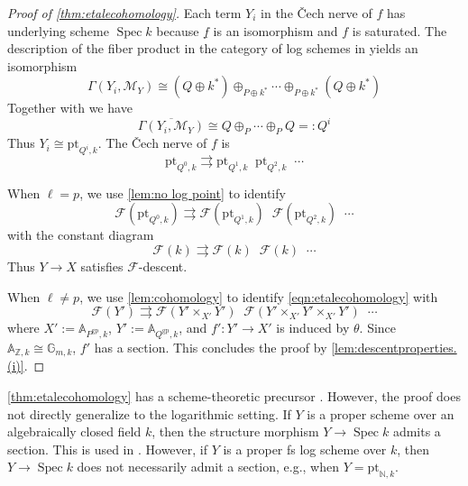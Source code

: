 \documentclass[10pt]{amsart}
\newcommand{\A}{\mathbb{A}}
\newcommand{\G}{\mathbb{G}}
\newcommand{\N}{\mathbb{N}}
\newcommand{\Z}{\mathbb{Z}}
\newcommand{\cF}{\mathcal{F}}
\newcommand{\cM}{\mathcal{M}}
\newcommand{\gp}{\mathrm{gp}}
\DeclareMathOperator{\Spec}{Spec}
\newcommand{\ul}{\underline}
\newcommand{\ol}{\overline}
\DeclareMathOperator{\rightrightrightarrows}{\substack{\rightarrow \\[-1em] \rightarrow \\[-1em] \rightarrow}}
\DeclareMathOperator{\rightrightrightrightarrows}{\substack{\rightarrow\\[-1em] \rightarrow \\[-1em] \rightarrow\\[-1em] \rightarrow}}
\newcommand{\pt}{\mathrm{pt}}
\begin{document}
\begin{proof}[Proof of \cref{thm:etalecohomology}]
Each term $Y_i$ in the \v{C}ech nerve of $f$ has underlying scheme $\Spec{k}$ because $\ul{f}$ is an 
isomorphism and $f$ is saturated.
The description of the fiber product in the category of log schemes in \cite[Proposition III.2.1.2]{Ogu} 
yields an isomorphism
\[
\Gamma(Y_i,\cM_Y)
\cong
(Q\oplus k^*)\oplus_{P\oplus k^*} \cdots \oplus_{P\oplus k^*} (Q\oplus k^*)
\]
Together with \cite[Proposition I.4.2.5.(5)]{Ogu} we have
\[
\ol{\Gamma(Y_i,\cM_Y)}
\cong
Q\oplus_P \cdots \oplus_P Q =: Q^i
\]
Thus $Y_i\cong \pt_{Q^i,k}$.
The \v{C}ech nerve of $f$ is
\[
\pt_{Q^0,k} \rightrightarrows \pt_{Q^1,k}
\rightrightrightarrows
\pt_{Q^2,k}
\rightrightrightarrows
\cdots
\]

When $\ell=p$, we use \cref{lem:no log point} to identify 
\begin{equation}
\label{eqn:etalecohomology}
\cF(\pt_{Q^0,k}) \rightrightarrows \cF(\pt_{Q^1,k})
\rightrightrightarrows
\cF(\pt_{Q^2,k})
\rightrightrightrightarrows
\cdots
\end{equation}
with the constant diagram
\[
\cF(k) \rightrightarrows \cF(k)
\rightrightrightarrows
\cF(k)
\rightrightrightrightarrows
\cdots
\]
Thus $Y\to X$ satisfies $\cF$-descent.

When $\ell\neq p$, 
we use \cref{lem:cohomology} to identify \eqref{eqn:etalecohomology}
with 
\[
\cF(Y') \rightrightarrows \cF(Y'\times_{X'}Y')
\rightrightrightarrows
\cF(Y'\times_{X'}Y'\times_{X'} Y') 
\rightrightrightrightarrows
\cdots
\]
where $X':=\A_{P^\gp,k}$, $Y':=\A_{Q^\gp,k}$, and $f'\colon Y'\to X'$ is induced by $\theta$.
Since $\A_{\Z,k}\cong \G_{m,k}$, $f'$ has a section.
This concludes the proof by \ref{lem:descentproperties.(i)}.
\end{proof}

\begin{remark}
\label{remark:notstraigthforward}
\cref{thm:etalecohomology} has a 
scheme-theoretic precursor 
\cite[Proposition 5.2]{MR4278670}. 
However, 
the proof does not directly generalize to the logarithmic setting.
If $Y$ is a proper scheme over an algebraically closed field $k$, 
then the structure morphism $Y\to \Spec{k}$ admits a section.
This is used in \cite[Proof of Proposition 5.2]{MR4278670}.
However, if $Y$ is a proper fs log scheme over $k$,
then $Y\to \Spec{k}$ does not necessarily admit a section, 
e.g., when $Y=\pt_{\N,k}$.
\end{remark}
\end{document}
